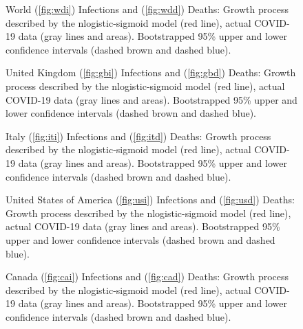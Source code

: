 \documentclass[journal]{IEEEtran}
\theoremstyle{plain}
\theoremstyle{definition}
\theoremstyle{remark}
\begin{document}
\begin{figure}[t]
	\centering
	\quad
	
	\caption{World (\ref{fig:wdi}) Infections and (\ref{fig:wdd}) Deaths: Growth process described by the nlogistic-sigmoid model (red line), actual COVID-19 data (gray lines and areas). Bootstrapped 95\% upper and lower confidence intervals (dashed brown and dashed blue).}
	\label{fig:wd}
\end{figure}
\begin{figure}[t]
	\centering
	\quad
	
	\caption{United Kingdom (\ref{fig:gbi}) Infections and (\ref{fig:gbd}) Deaths: Growth process described by the nlogistic-sigmoid model (red line), actual COVID-19 data (gray lines and areas). Bootstrapped 95\% upper and lower confidence intervals (dashed brown and dashed blue).}
\end{figure}
\begin{figure}[t]
	\centering
	\quad
	
	\caption{Italy (\ref{fig:iti}) Infections and (\ref{fig:itd}) Deaths: Growth process described by the nlogistic-sigmoid model (red line), actual COVID-19 data (gray lines and areas). Bootstrapped 95\% upper and lower confidence intervals (dashed brown and dashed blue).}
\end{figure}
\begin{figure}[t]
	\centering
	\quad
	
	\caption{United States of America (\ref{fig:usi}) Infections and (\ref{fig:usd}) Deaths: Growth process described by the nlogistic-sigmoid model (red line), actual COVID-19 data (gray lines and areas). Bootstrapped 95\% upper and lower confidence intervals (dashed brown and dashed blue).}
\end{figure}
\begin{figure}[t]
	\centering
	\quad
	
	\caption{Canada (\ref{fig:cai}) Infections and (\ref{fig:cad}) Deaths: Growth process described by the nlogistic-sigmoid model (red line), actual COVID-19 data (gray lines and areas). Bootstrapped 95\% upper and lower confidence intervals (dashed brown and dashed blue).}
\end{figure}
\end{document}
